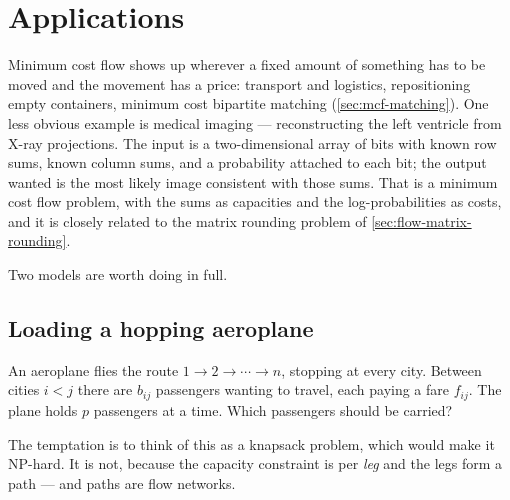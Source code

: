 \section{Applications}
\label{sec:mcf-applications}

Minimum cost flow shows up wherever a fixed amount of something has to be moved
and the movement has a price: transport and logistics, repositioning empty
containers, minimum cost bipartite matching (\cref{sec:mcf-matching}). One less
obvious example is medical imaging --- reconstructing the left ventricle from
X-ray projections. The input is a two-dimensional array of bits with known row
sums, known column sums, and a probability attached to each bit; the output
wanted is the most likely image consistent with those sums. That is a minimum
cost flow problem, with the sums as capacities and the log-probabilities as
costs, and it is closely related to the matrix rounding problem of
\cref{sec:flow-matrix-rounding}.

Two models are worth doing in full.

\subsection{Loading a hopping aeroplane}
\label{sec:mcf-hopping-plane}

An aeroplane flies the route $1 \to 2 \to \cdots \to n$, stopping at every city.
Between cities $i < j$ there are $b_{ij}$ passengers wanting to travel, each
paying a fare $f_{ij}$. The plane holds $p$ passengers at a time. Which
passengers should be carried?

The temptation is to think of this as a knapsack problem, which would make it
NP-hard. It is not, because the capacity constraint is per \emph{leg} and the
legs form a path --- and paths are flow networks.

